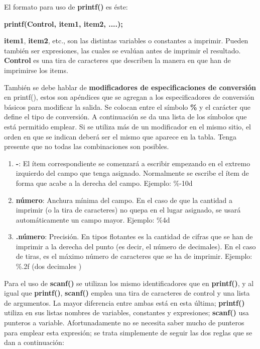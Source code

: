 El formato para uso de \textbf{printf()} es éste:

\qquad \textbf{ printf(Control, item1, item2, ....);} 

\textbf{item1}, \textbf{item2}, etc., son las distintas variables o constantes a imprimir. Pueden también ser expresiones, las cuales se evalúan antes de imprimir el resultado. \textbf{Control} es una tira de caracteres que
describen la manera en que han de imprimirse los items.

También se debe hablar de \textbf{modificadores de especificaciones de conversión} en printf(), estos son
apéndices que se agregan a los especificadores de conversión básicos para modificar la salida. Se
colocan entre el símbolo \textbf{\%} y el carácter que define el tipo de conversión. A continuación se da una
lista de los símbolos que está permitido emplear. Si se utiliza más de un modificador en el mismo
sitio, el orden en que se indican deberá ser el mismo que aparece en la tabla. Tenga presente que no
todas las combinaciones son posibles.

\begin{enumerate}
	\item \textbf{-}: El ítem correspondiente se comenzará a escribir empezando en el extremo izquierdo del
campo que tenga asignado. Normalmente se escribe el ítem de forma que acabe a la
derecha del campo.
Ejemplo: \%-10d
	\item \textbf{número}: Anchura mínima del campo. En el caso de que la cantidad a imprimir (o la tira de caracteres) no quepa en el lugar asignado, se usará automáticamente un campo mayor. Ejemplo: \%4d
	\item \textbf{.número}: Precisión. En tipos flotantes es la cantidad de cifras que se han de imprimir a la derecha
del punto (es decir, el número de decimales). En el caso de tiras, es el máximo número de caracteres que se ha de imprimir. Ejemplo: \%.2f (dos decimales )
\end{enumerate}

Para el uso de \textbf{scanf()} se utilizan los mismo identificadores que en \textbf{printf()}, y al igual que \textbf{printf()},
\textbf{scanf()} emplea una tira de caracteres de control y una lista de argumentos. La mayor diferencia
entre ambas está en esta última; \textbf{printf()} utiliza en sus listas nombres de variables, constantes y
expresiones; \textbf{scanf()} usa punteros a variable. Afortunadamente no se necesita saber mucho de
punteros para emplear esta expresión; se trata simplemente de seguir las dos reglas que se dan a
continuación:

